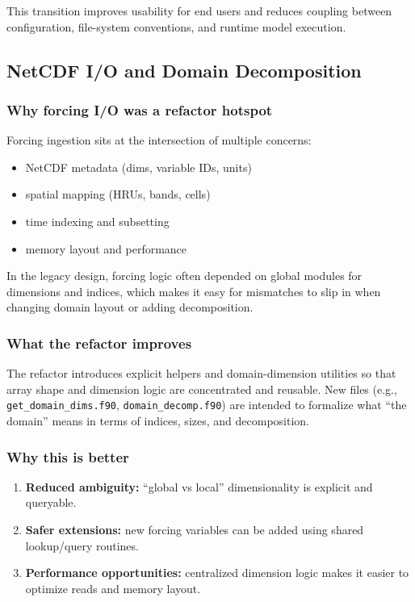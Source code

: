 \documentclass[11pt]{scrartcl}
\begin{document}
This transition improves usability for end users and reduces coupling between configuration,
file-system conventions, and runtime model execution.



\subsection{NetCDF I/O and Domain Decomposition}

\subsubsection{Why forcing I/O was a refactor hotspot}

Forcing ingestion sits at the intersection of multiple concerns:
\begin{itemize}[leftmargin=*]
\item NetCDF metadata (dims, variable IDs, units)
\item spatial mapping (HRUs, bands, cells)
\item time indexing and subsetting
\item memory layout and performance
\end{itemize}

In the legacy design, forcing logic often depended on global modules for dimensions and indices,
which makes it easy for mismatches to slip in when changing domain layout or adding decomposition.

\subsubsection{What the refactor improves}

The refactor introduces explicit helpers and domain-dimension utilities so that array shape and
dimension logic are concentrated and reusable. New files (e.g., \texttt{get\_domain\_dims.f90},
\texttt{domain\_decomp.f90}) are intended to formalize what ``the domain'' means in terms of indices,
sizes, and decomposition.

\subsubsection{Why this is better}

\begin{enumerate}[leftmargin=*]
\item \textbf{Reduced ambiguity:} ``global vs local'' dimensionality is explicit and queryable.
\item \textbf{Safer extensions:} new forcing variables can be added using shared lookup/query routines.
\item \textbf{Performance opportunities:} centralized dimension logic makes it easier to optimize reads and memory layout.
\end{enumerate}
\end{document}
